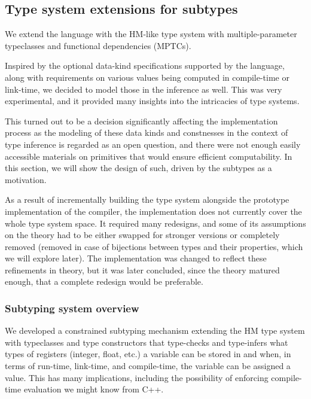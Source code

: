 \subsection{Type system extensions for \cmm subtypes}
\label{sec:typesystem}

We extend the language with the HM-like type system with multiple-parameter typeclasses and functional dependencies (MPTCs).

Inspired by the optional data-kind specifications supported by the \cmm language, along with requirements on various values being computed in compile-time or link-time, we decided to model those in the inference as well. This was very experimental, and it provided many insights into the intricacies of type systems.

This turned out to be a decision significantly affecting the implementation process as the modeling of these data kinds and constnesses in the context of type inference is regarded as an open question, and there were not enough easily accessible materials on primitives that would ensure efficient computability. In this section, we will show the design of such, driven by the \cmm subtypes as a motivation.

As a result of incrementally building the type system alongside the prototype implementation of the compiler\cmmrepo, the implementation does not currently cover the whole type system space. It required many redesigns, and some of its assumptions on the theory had to be either swapped for stronger versions or completely removed (removed in case of bijections between types and their properties, which we will explore later). The implementation was changed to reflect these refinements in theory, but it was later concluded, since the theory matured enough, that a complete redesign would be preferable.

\subsubsection{Subtyping system overview}

We developed a constrained subtyping mechanism extending the HM type system with typeclasses and type constructors that type-checks and type-infers what types of registers (integer, float, etc.) a variable can be stored in and when, in terms of run-time, link-time, and compile-time, the variable can be assigned a value. This has many implications, including the possibility of enforcing compile-time evaluation we might know from C++.

